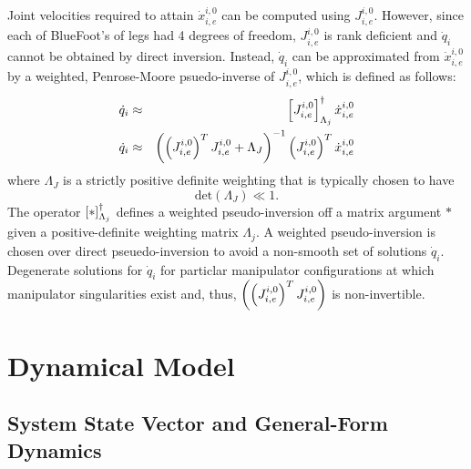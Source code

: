 			Joint velocities required to attain $\dot{x}^{i,0}_{i,e}$ can be computed using $J^{i,0}_{i,e}$. However, since each of BlueFoot's of legs had 4 degrees of freedom, $J^{i,0}_{i,e}$ is rank deficient and $\dot{q}_{i}$ cannot be obtained by direct inversion. Instead, $\dot{q}_{i}$ can be approximated from $\dot{x}^{i,0}_{i,e}$ by a weighted, Penrose-Moore psuedo-inverse of $J^{i,0}_{i,e}$, which is defined as follows:
		\begin{eqnarray}
			\dot{q}_{i} &\approx& \left[J^{i,0}_{i,e}\right]_{\Lambda_{j}}^{\dagger} \dot{x}^{i,0}_{i,e} \nonumber \\
			\dot{q}_{i} &\approx& \left( \left(J^{i,0}_{i,e}\right)^{T}J^{i,0}_{i,e} + \Lambda_{J} \right)^{-1} \left(J^{i,0}_{i,e}\right)^{T}\dot{x}^{i,0}_{i,e}
		\end{eqnarray}
where $\Lambda_{J}$ is a strictly positive definite weighting that is typically chosen to have 
		\begin{equation*}
			\text{det}(\Lambda_{J}) \ll 1.
		\end{equation*}
The operator $\left[*\right]_{\Lambda_{j}}^{\dagger}$ defines a weighted pseudo-inversion off a matrix argument $*$ given a positive-definite weighting matrix $\Lambda_{j}$. A weighted pseudo-inversion is chosen over direct pseuedo-inversion to avoid a non-smooth set of solutions $\dot{q}_{i}$. Degenerate solutions for $\dot{q}_{i}$ for particlar manipulator configurations at which manipulator singularities exist and, thus, $\left(\left(J^{i,0}_{i,e}\right)^{T}J^{i,0}_{i,e}\right)$ is non-invertible.




	\section{Dynamical Model}
	

		\subsection{System State Vector and General-Form Dynamics}
		
